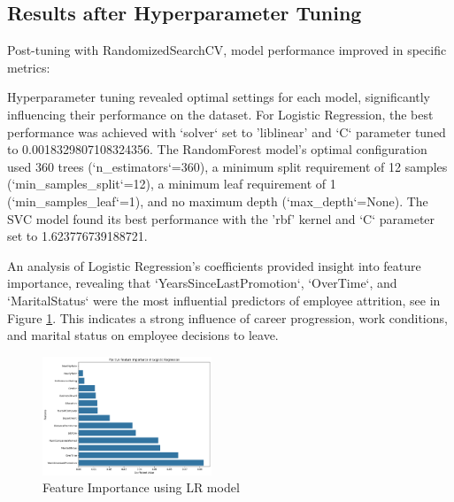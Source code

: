 \documentclass[12pt, twocolumn]{article}
\begin{document}
	\subsection{Results after Hyperparameter Tuning}
	
	Post-tuning with RandomizedSearchCV, model performance improved in specific metrics:
	
	\begin{table}[H]
		\centering
		\caption{Class 1 Performance Metrics After Hyperparameter Tuning}
		\label{tab:post-tuning-class1}
	\end{table}
	
	Hyperparameter tuning revealed optimal settings for each model, significantly influencing their performance on the dataset. For Logistic Regression, the best performance was achieved with `solver` set to 'liblinear' and `C` parameter tuned to 0.0018329807108324356. The RandomForest model's optimal configuration used 360 trees (`n\_estimators`=360), a minimum split requirement of 12 samples (`min\_samples\_split`=12), a minimum leaf requirement of 1 (`min\_samples\_leaf`=1), and no maximum depth (`max\_depth`=None). The SVC model found its best performance with the 'rbf' kernel and `C` parameter set to 1.623776739188721.
	
	An analysis of Logistic Regression's coefficients provided insight into feature importance, revealing that `YearsSinceLastPromotion`, `OverTime`, and `MaritalStatus` were the most influential predictors of employee attrition, see in Figure \ref{fig:featureImportanceLR}. This indicates a strong influence of career progression, work conditions, and marital status on employee decisions to leave.
	
	\begin{figure}[H]
		\centering
		\includegraphics[width=0.45\textwidth]{featureImportanceLR.png}
		\caption{Feature Importance using LR model}
		\label{fig:featureImportanceLR}
	\end{figure}
	
\end{document}
